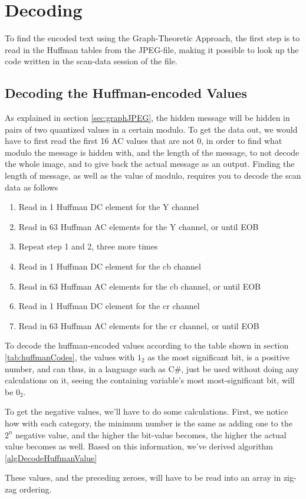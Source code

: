 \section{Decoding}
To find the encoded text using the Graph-Theoretic Approach, the first step is to read in the Huffman tables from the JPEG-file, making it possible to look up the code written in the scan-data session of the file. 


\subsection*{Decoding the Huffman-encoded Values}
As explained in section \ref{sec:graphJPEG}, the hidden message will be hidden in pairs of two quantized values in a certain modulo.
To get the data out, we would have to first read the first 16 AC values that are not 0, in order to find what modulo the message is hidden with, and the length of the message, to not decode the whole image, and to give back the actual message as an output.
Finding the length of message, as well as the value of modulo, requires you to decode the scan data as follows
\begin{enumerate}
	\item Read in 1 Huffman DC element for the Y channel
	\item Read in 63 Huffman AC elements for the Y channel, or until EOB
	\item Repeat step 1 and 2, three more times
	\item Read in 1 Huffman DC element for the cb channel
	\item Read in 63 Huffman AC elements for the cb channel, or until EOB
	\item Read in 1 Huffman DC element for the cr channel
	\item Read in 63 Huffman AC elements for the cr channel, or until EOB
\end{enumerate}
To decode the huffman-encoded values according to the table shown in section \ref{tab:huffmanCodes}, the values with $1_2$ as the most significant bit, is a positive number, and can thus, in a language such as C\#, just be used without doing any calculations on it, seeing the containing variable's most most-significant bit, will be $0_2$.

To get the negative values, we'll have to do some calculations. 
First, we notice how with each category, the minimum number is the same as adding one to the $2^n$ negative value, and the higher the bit-value becomes, the higher the actual value becomes as well. 
Based on this information, we've derived algorithm \ref{algDecodeHuffmanValue}

These values, and the preceding zeroes, will have to be read into an array in zig-zag ordering.

